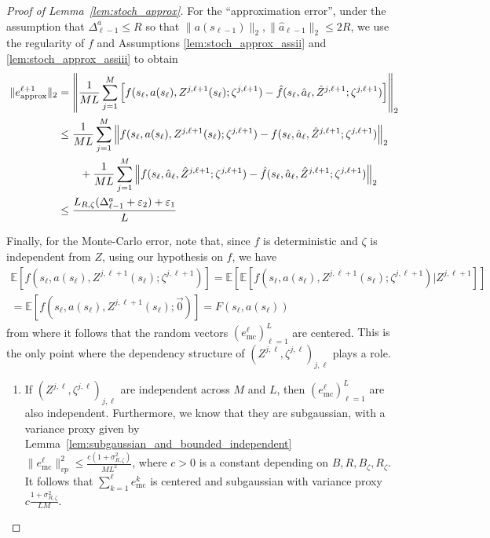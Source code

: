 \documentclass[a4paper,11pt]{article}
\newcommand{\1}{\mathbbm{1}}
\newcommand{\E}{\mathbb{E}}
\theoremstyle{definition}
\theoremstyle{remark}
\begin{document}
\begin{proof}[Proof of Lemma~\ref{lem:stoch_approx}]
For the ``approximation error'', under the assumption that
$\Delta^a_{\ell-1} \leq R$ so that $\|a(s_{\ell-1})\|_2, \|\hat{a}_{\ell-1}\|_2 \leq 2R$, we use the
regularity of $f$ and Assumptions \ref{lem:stoch_approx_assii} and \ref{lem:stoch_approx_assiii} to obtain
\begin{align}\label{eq:stoch_approx_bound_err_approx}
\|e^{\ell+1}_{\mathrm{approx}}\|_2
&= \left\| \frac{1}{ML} \sum_{j=1}^{M}
      \left[ f(s_\ell, a(s_\ell), Z^{j,\ell+1}(s_\ell){;\zeta^{j,\ell+1}})
      - \hat{f}(s_\ell, \hat{a}_\ell, \hat{Z}^{j,\ell+1}{;\zeta^{j,\ell+1}}) \right]\right\|_2 \notag\\
&\leq \frac{1}{ML} \sum_{j=1}^{M}
      \left\|f(s_\ell, a(s_\ell), Z^{j,\ell+1}(s_\ell){;\zeta^{j,\ell+1}})
      - f(s_\ell, \hat{a}_\ell, \hat{Z}^{j,\ell+1}{;\zeta^{j,\ell+1}}) \right\|_{2} \notag\\
      &\qquad +\frac{1}{ML} \sum_{j=1}^{M}
      \left\|f(s_\ell, \hat{a}_\ell, \hat{Z}^{j,\ell+1}{;\zeta^{j,\ell+1}})
      - \hat{f}(s_\ell, \hat{a}_\ell, \hat{Z}^{j,\ell+1}{;\zeta^{j,\ell+1}}) \right\|_{2}\notag \\
&\leq \frac{L_{R{,\zeta}}(\Delta^a_{\ell-1} + \varepsilon_2) + \varepsilon_1}{L}
\end{align}

Finally, for the Monte-Carlo error, note that, since $f$ is deterministic and $\zeta$ is independent from $Z$, using our hypothesis on $f$, we have 
\begin{multline*}
    {\E[f(s_\ell, a(s_\ell), Z^{j,\ell+1}(s_\ell){; \zeta^{j,\ell+1}})] = \E[\E[f(s_\ell, a(s_\ell), Z^{j,\ell+1}(s_\ell){; \zeta^{j,\ell+1}})|Z^{j,\ell +1}]]} \\= \E[f(s_\ell, a(s_\ell), Z^{j,\ell+1}(s_\ell){;\vec{0}})] = F(s_\ell, a(s_\ell))
\end{multline*}
from where it follows that the random vectors $(e^\ell_{\mathrm{mc}})_{\ell=1}^{L}$ are centered. 
{This is the only point where the dependency structure of $(Z^{j,\ell}, \zeta^{j,\ell})_{j,\ell}$ plays a role.}
\begin{enumerate}
    \item {If $(Z^{j,\ell}, \zeta^{j,\ell})_{j,\ell}$ are independent across $M$ and $L$, then $(e^\ell_{\mathrm{mc}})_{\ell=1}^{L}$ are also independent. {Furthermore, we know that they are subgaussian, with a variance proxy given by Lemma~\ref{lem:subgaussian_and_bounded_independent} $\|e^\ell_{\mathrm{mc}}\|^2_{vp} \leq \frac{c(1+\sigma_{R,\zeta}^2)}{ML^2}$, where $c>0$ is a constant depending on $B,R, B_\zeta, R_\zeta$. It follows that 
$\sum_{k=1}^{\ell} e^k_{\mathrm{mc}}$ is centered and subgaussian with variance proxy
$c\frac{1+\sigma_{R{,\zeta}}^2}{L M}$.}}


\end{enumerate}
\end{proof}
\end{document}
